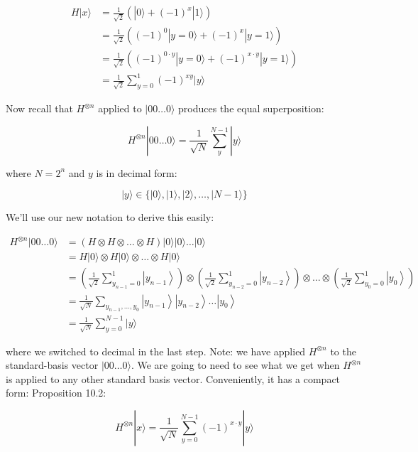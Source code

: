 \documentclass[main.tex]{subfiles}
\begin{document}
    $$
    \begin{aligned}
    H|x\rangle &=\frac{1}{\sqrt{2}}\left(|0\rangle+(-1)^{x}|1\rangle\right) \\
    &=\frac{1}{\sqrt{2}}\left((-1)^{0}|y=0\rangle+(-1)^{x}|y=1\rangle\right) \\
    &=\frac{1}{\sqrt{2}}\left((-1)^{0 \cdot y}|y=0\rangle+(-1)^{x \cdot y}|y=1\rangle\right) \\
    &=\frac{1}{\sqrt{2}} \sum_{y=0}^{1}(-1)^{x y}|y\rangle
    \end{aligned}
    $$
    
    Now recall that $H^{\otimes n}$ applied to $|00 \ldots 0\rangle$ produces the equal superposition:
    
    $$
    H^{\otimes n}|00 \ldots 0\rangle=\frac{1}{\sqrt{N}} \sum_{y}^{N-1}|y\rangle
    $$
    
    where $N=2^{n}$ and $y$ is in decimal form:
    
    $$
    |y\rangle \in\{|0\rangle,|1\rangle,|2\rangle, \ldots,|N-1\rangle\}
    $$
    
    We'll use our new notation to derive this easily:
    
    $$
    \begin{aligned}
    H^{\otimes n}|00 \ldots 0\rangle &=(H \otimes H \otimes \ldots \otimes H)|0\rangle|0\rangle \ldots|0\rangle \\
    &=H|0\rangle \otimes H|0\rangle \otimes \ldots \otimes H|0\rangle \\
    &=\left(\frac{1}{\sqrt{2}} \sum_{y_{n-1}=0}^{1}\left|y_{n-1}\right\rangle\right) \otimes\left(\frac{1}{\sqrt{2}} \sum_{y_{n-2}=0}^{1}\left|y_{n-2}\right\rangle\right) \otimes \ldots \otimes\left(\frac{1}{\sqrt{2}} \sum_{y_{0}=0}^{1}\left|y_{0}\right\rangle\right) \\
    &=\frac{1}{\sqrt{N}} \sum_{y_{n-1}, \ldots, y_{0}}\left|y_{n-1}\right\rangle\left|y_{n-2}\right\rangle \ldots\left|y_{0}\right\rangle \\
    &=\frac{1}{\sqrt{N}} \sum_{y=0}^{N-1}|y\rangle
    \end{aligned}
    $$
    
    where we switched to decimal in the last step. Note: we have applied $H^{\otimes n}$ to the standard-basis vector $|00 \ldots 0\rangle$. We are going to need to see what we get when $H^{\otimes n}$ is applied to any other standard basis vector. Conveniently, it has a compact form:
    Proposition 10.2:
    
    $$
    H^{\otimes n}|x\rangle=\frac{1}{\sqrt{N}} \sum_{y=0}^{N-1}(-1)^{x \cdot y}|y\rangle
    $$
    
\end{document}
